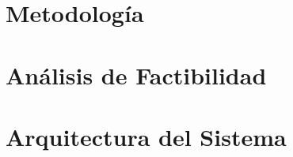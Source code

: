 \chapter{Metodología} \label{chp:metodologia}
\chapter{Análisis de Factibilidad} \label{chp:factibilidad}
\chapter{Arquitectura del Sistema} \label{chp:arquitectura}
